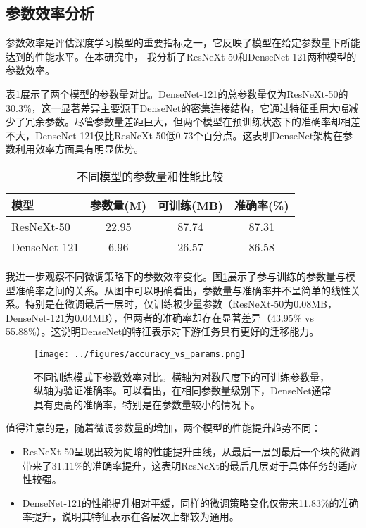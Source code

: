 \documentclass[a4paper,10pt,twocolumn]{article}
\makeatletter
\renewcommand{\arraystretch}{1.2}  %
\let\@oldlabel\label
\renewcommand{\label}[1]{\@oldlabel{#1}}
\makeatother
\begin{document}
\subsection{参数效率分析}
参数效率是评估深度学习模型的重要指标之一，它反映了模型在给定参数量下所能达到的性能水平。在本研究中， 我分析了ResNeXt-50和DenseNet-121两种模型的参数效率。

表\ref{tab:param_compare}展示了两个模型的参数量对比。DenseNet-121的总参数量仅为ResNeXt-50的30.3\%，这一显著差异主要源于DenseNet的密集连接结构，它通过特征重用大幅减少了冗余参数。尽管参数量差距巨大，但两个模型在预训练状态下的准确率却相差不大，DenseNet-121仅比ResNeXt-50低0.73个百分点。这表明DenseNet架构在参数利用效率方面具有明显优势。

\begin{table}[H]
\centering
\caption{不同模型的参数量和性能比较}
\label{tab:param_compare}
\renewcommand{\arraystretch}{1.2}
\begin{tabular}{lccc}
\toprule
\textbf{模型} & \textbf{参数量(M)} & \textbf{可训练(MB)} & \textbf{准确率(\%)} \\
\midrule
ResNeXt-50 & 22.95 & 87.74 & 87.31 \\
DenseNet-121 & 6.96 & 26.57 & 86.58 \\
\bottomrule
\end{tabular}
\end{table}

 我进一步观察不同微调策略下的参数效率变化。图\ref{fig:acc_vs_params_1}展示了参与训练的参数量与模型准确率之间的关系。从图中可以明确看出，参数量与准确率并不呈简单的线性关系。特别是在微调最后一层时，仅训练极少量参数（ResNeXt-50为0.08MB，DenseNet-121为0.04MB），但两者的准确率却存在显著差异（43.95\% vs 55.88\%）。这说明DenseNet的特征表示对下游任务具有更好的迁移能力。

\begin{figure}[H]
\centering
\texttt{[image: ../figures/accuracy\_vs\_params.png]}
\caption{不同训练模式下参数效率对比。横轴为对数尺度下的可训练参数量，纵轴为验证准确率。可以看出，在相同参数量级别下，DenseNet通常具有更高的准确率，特别是在参数量较小的情况下。}
\label{fig:acc_vs_params_1}
\end{figure}

值得注意的是，随着微调参数量的增加，两个模型的性能提升趋势不同：
\begin{itemize}
    \item ResNeXt-50呈现出较为陡峭的性能提升曲线，从最后一层到最后一个块的微调带来了31.11\%的准确率提升，这表明ResNeXt的最后几层对于具体任务的适应性较强。
    \item DenseNet-121的性能提升相对平缓，同样的微调策略变化仅带来11.83\%的准确率提升，说明其特征表示在各层次上都较为通用。
\end{itemize}
\end{document}
